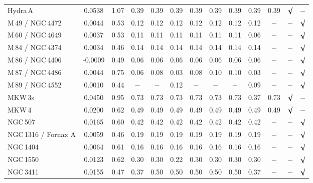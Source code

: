 \documentclass{aa}
\begin{document}
\begin{table}[!]
\begin{centering}
\begin{tabular}{l c c c c c c c c c c c c}
Hydra\,A &    0.0538 & 1.07 & 0.39 & 0.39 & 0.39 & 0.39 & 0.39 & 0.39 & 0.39 & 0.39 & $\surd$ & $-$ \\

M\,49 / NGC\,4472 &    0.0044 & 0.53 & 0.12 & 0.12 & 0.12 & 0.12 & 0.12 & 0.12 & 0.12 & $-$ &  $-$ & $\surd$ \\

M\,60 / NGC\,4649 &   0.0037 & 0.53 & 0.11 & 0.11 & 0.11 & 0.11 & 0.11 & 0.11 & 0.06 & $-$ & $-$ & $\surd$ \\

M\,84 / NGC\,4374 &   0.0034 & 0.46 & 0.14 & 0.14 & 0.14 & 0.14 & 0.14 & 0.14 & 0.14 & $-$ & $-$ & $\surd$ \\

M\,86 / NGC\,4406 &    -0.0009 & 0.49 & 0.06 & 0.06 & 0.06 & 0.06 & 0.06 & 0.06 & 0.06 & $-$ & $-$ & $\surd$ \\

M\,87 / NGC\,4486 &    0.0044 & 0.75 & 0.06 & 0.08 & 0.03 & 0.08 & 0.10 & 0.10 & 0.03 & $-$ & $-$ & $\surd$ \\

M\,89 / NGC\,4552 &    0.0010 & 0.44 & $-$ & $-$ & 0.12 & $-$ & $-$ & $-$ & 0.09 & $-$ & $-$ & $\surd$ \\

MKW\,3s &    0.0450 & 0.95 & 0.73 & 0.73 & 0.73 & 0.73 & 0.73 & 0.73 & 0.37 & 0.73 & $\surd$ & $-$ \\

MKW\,4 &   0.0200 & 0.62 & 0.49 & 0.49 & 0.49 & 0.49 & 0.49 & 0.49 & 0.49 & 0.49 & $\surd$ & $-$ \\

NGC\,507 &   0.0165 & 0.60 & 0.42 & 0.42 & 0.42 & 0.42 & 0.42 & 0.42 & 0.42 & $-$ & $-$ & $\surd$ \\

NGC\,1316 / Fornax A &   0.0059 & 0.46 & 0.19 & 0.19 & 0.19 & 0.19 & 0.19 & 0.19 & 0.19 & $-$ & $-$ & $\surd$ \\

NGC\,1404 &   0.0064 & 0.61 & 0.16 & 0.16 & 0.16 & 0.16 & 0.16 & 0.16 & 0.16 & $-$ & $-$ & $\surd$ \\

NGC\,1550 &   0.0123 & 0.62 & 0.30 & 0.30 & 0.22 & 0.30 & 0.30 & 0.30 & 0.30 & $-$ & $-$ & $\surd$ \\

NGC\,3411 &   0.0155 & 0.47 & 0.37 & 0.50 & 0.50 & 0.50 & 0.50 & 0.50 & 0.37 & $-$ & $-$ & $\surd$ \\


\end{tabular}
\end{centering}
\end{table}
\end{document}
